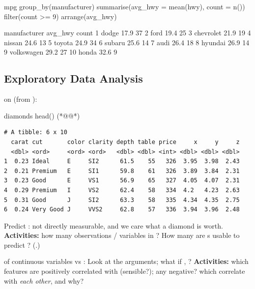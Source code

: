 \begin{rcode}
mpg %
  group_by(manufacturer) %
  summarise(avg_hwy = mean(hwy),
            count = n()) %
  filter(count >= 9) %
  arrange(avg_hwy)
\end{rcode}
\begin{routput}
   manufacturer avg_hwy count
 1 dodge           17.9    37
 2 ford            19.4    25
 3 chevrolet       21.9    19
 4 nissan          24.6    13
 5 toyota          24.9    34
 6 subaru          25.6    14
 7 audi            26.4    18
 8 hyundai         26.9    14
 9 volkswagen      29.2    27
10 honda           32.6     9
\end{routput}

\subsection{Exploratory Data Analysis}
%
 on  (from ):
\begin{rcode}
diamonds %
  head() (*@@*)
\end{rcode}
\begin{lstlisting}[style=cs/rout,basicstyle=\ttfamily\scriptsize]
# A tibble: 6 x 10
  carat cut       color clarity depth table price     x     y     z
  <dbl> <ord>     <ord> <ord>   <dbl> <dbl> <int> <dbl> <dbl> <dbl>
1  0.23 Ideal     E     SI2      61.5    55   326  3.95  3.98  2.43
2  0.21 Premium   E     SI1      59.8    61   326  3.89  3.84  2.31
3  0.23 Good      E     VS1      56.9    65   327  4.05  4.07  2.31
4  0.29 Premium   I     VS2      62.4    58   334  4.2   4.23  2.63
5  0.31 Good      J     SI2      63.3    58   335  4.34  4.35  2.75
6  0.24 Very Good J     VVS2     62.8    57   336  3.94  3.96  2.48
\end{lstlisting}
Predict : not directly measurable, and we care what a diamond is worth.
\textbf{Activities:} how many observations / variables in ? How many are s usable to predict ? (.)

 of continuous variables vs :
%
Look at the  arguments; what if , ? \textbf{Activities:} which features are positively correlated with  (sensible?); any negative? which correlate with \emph{each other}, and why?

